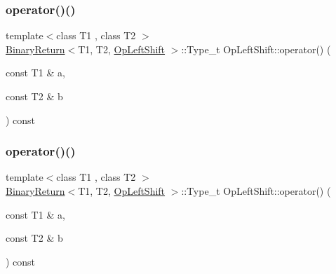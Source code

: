 \subsubsection{\texorpdfstring{operator()()}{operator()()}\hspace{0.1cm}{\footnotesize\ttfamily [1/3]}}
{\footnotesize\ttfamily template$<$class T1 , class T2 $>$ \\
\mbox{\hyperlink{structBinaryReturn}{Binary\+Return}}$<$T1, T2, \mbox{\hyperlink{structOpLeftShift}{Op\+Left\+Shift}} $>$\+::Type\+\_\+t Op\+Left\+Shift\+::operator() (\begin{DoxyParamCaption}\item[{const T1 \&}]{a,  }\item[{const T2 \&}]{b }\end{DoxyParamCaption}) const\hspace{0.3cm}{\ttfamily [inline]}}

\mbox{\label{structOpLeftShift_a1f91da026aec3d0ff36e700c21152b3c}} 
\subsubsection{\texorpdfstring{operator()()}{operator()()}\hspace{0.1cm}{\footnotesize\ttfamily [2/3]}}
{\footnotesize\ttfamily template$<$class T1 , class T2 $>$ \\
\mbox{\hyperlink{structBinaryReturn}{Binary\+Return}}$<$T1, T2, \mbox{\hyperlink{structOpLeftShift}{Op\+Left\+Shift}} $>$\+::Type\+\_\+t Op\+Left\+Shift\+::operator() (\begin{DoxyParamCaption}\item[{const T1 \&}]{a,  }\item[{const T2 \&}]{b }\end{DoxyParamCaption}) const\hspace{0.3cm}{\ttfamily [inline]}}

\mbox{\label{structOpLeftShift_a1f91da026aec3d0ff36e700c21152b3c}} 
